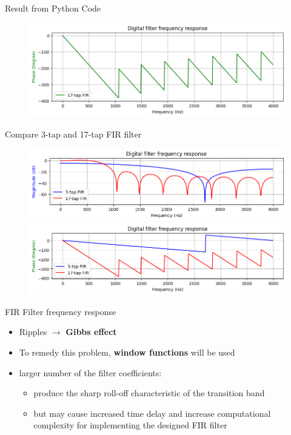 \documentclass[pdflatex,compress,mathserif]{beamer}
\begin{document}
\begin{frame}{Result from Python Code}
    \begin{figure}
        \centering
        \includegraphics[width=\linewidth]{./img/img15.png}
    \end{figure}
\end{frame}

\begin{frame}{Compare 3-tap and 17-tap FIR filter}
    \begin{figure}
        \centering
        \includegraphics[width=\linewidth]{./img/img16.png}
        \includegraphics[width=\linewidth]{./img/img17.png}
    \end{figure}
\end{frame}

\begin{frame}{FIR Filter frequency response}
    \begin{itemize}
        \item Ripples $\rightarrow$ \textbf{Gibbs effect}
        \item To remedy this problem, \textbf{window functions} will be used
        \item larger number of the filter coefficients:
        \begin{itemize}
            \item produce the sharp roll-off characteristic of the transition band
            \item but may cause increased time delay and increase computational complexity for implementing the designed FIR filter
        \end{itemize}
    \end{itemize}
\end{frame}
\end{document}
